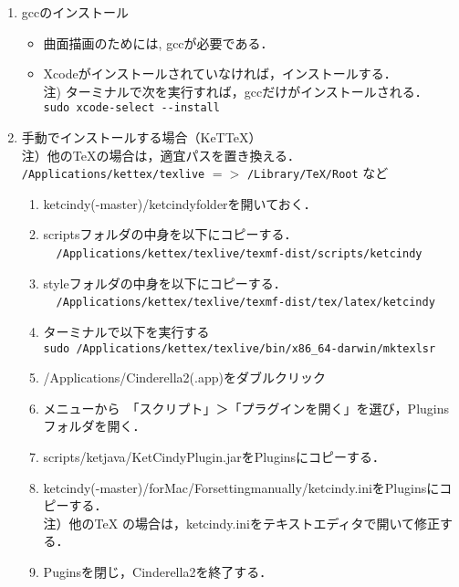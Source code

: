 \documentclass{ujarticle}
\begin{document}
\begin{enumerate}[\bf\large 1.]
\item gccのインストール
  \begin{itemize}
    \item 曲面描画のためには, gccが必要である．
    \item Xcodeがインストールされていなければ，インストールする．\\
    \hspace*{5mm}注) ターミナルで次を実行すれば，gccだけがインストールされる．\\
    \hspace*{20mm}\verb|sudo xcode-select --install|
  \end{itemize}

\item 手動でインストールする場合（KeTTeX）\\
\hspace*{1zw}注）他のTeXの場合は，適宜パスを置き換える．\\
\hspace*{3zw}\verb|/Applications/kettex/texlive| $=>$ \verb|/Library/TeX/Root| など
  \begin{enumerate}[(1)]
  \item ketcindy(-master)/ketcindyfolderを開いておく．
  \item scriptsフォルダの中身を以下にコピーする．\\
　\verb|/Applications/kettex/texlive/texmf-dist/scripts/ketcindy|
  \item styleフォルダの中身を以下にコピーする．\\
　\verb|/Applications/kettex/texlive/texmf-dist/tex/latex/ketcindy|
  \item ターミナルで以下を実行する\\
  \hspace*{1zw}\verb|sudo /Applications/kettex/texlive/bin/x86_64-darwin/mktexlsr|
  \item /Applications/Cinderella2(.app)をダブルクリック
  \item メニューから　「スクリプト」＞「プラグインを開く」を選び，Pluginsフォルダを開く．
  \item scripts/ketjava/KetCindyPlugin.jarをPluginsにコピーする．
  \item ketcindy(-master)/forMac/Forsettingmanually/ketcindy.iniをPluginsにコピーする．\\
  \hspace*{2zw}注）他のTeX の場合は，ketcindy.iniをテキストエディタで開いて修正する．
  \item Puginsを閉じ，Cinderella2を終了する．

\end{enumerate}
\end{enumerate}
\end{document}
